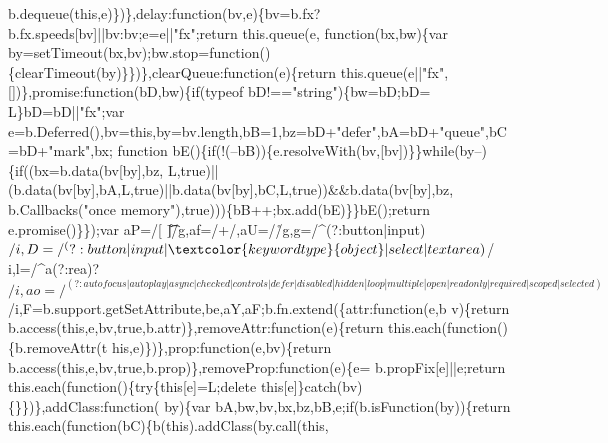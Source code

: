 \begin{DoxyCode}
      b.dequeue(\textcolor{keyword}{this},e)\})\},delay:\textcolor{keyword}{function}(bv,e)\{bv=b.fx?b.fx.speeds[bv]||bv:bv;e=e||\textcolor{stringliteral}{"fx"};\textcolor{keywordflow}{return} this.queue(e,\textcolor{keyword}{
      function}(bx,bw)\{var by=setTimeout(bx,bv);bw.stop=\textcolor{keyword}{function}()\{clearTimeout(by)\}\})\},clearQueue:\textcolor{keyword}{function}(e)\{\textcolor{keywordflow}{return} 
      this.queue(e||\textcolor{stringliteral}{"fx"},[])\},promise:\textcolor{keyword}{function}(bD,bw)\{\textcolor{keywordflow}{if}(typeof bD!==\textcolor{stringliteral}{"string"})\{bw=bD;bD=
      L\}bD=bD||\textcolor{stringliteral}{"fx"};var e=b.Deferred(),bv=\textcolor{keyword}{this},by=bv.length,bB=1,bz=bD+\textcolor{stringliteral}{"defer"},bA=bD+\textcolor{stringliteral}{"queue"},bC=bD+\textcolor{stringliteral}{"mark"},bx;\textcolor{keyword}{
      function} bE()\{\textcolor{keywordflow}{if}(!(--bB))\{e.resolveWith(bv,[bv])\}\}\textcolor{keywordflow}{while}(by--)\{\textcolor{keywordflow}{if}((bx=b.data(bv[by],bz,
      L,\textcolor{keyword}{true})||(b.data(bv[by],bA,L,\textcolor{keyword}{true})||b.data(bv[by],bC,L,\textcolor{keyword}{true}))&&b.data(bv[by],bz,
      b.Callbacks(\textcolor{stringliteral}{"once memory"}),\textcolor{keyword}{true})))\{bB++;bx.add(bE)\}\}bE();\textcolor{keywordflow}{return} e.promise()\}\});var aP=/[
      \n\t\r]/g,af=/\s+/,aU=/\r/g,g=/^(?:button|input)$/i,D=/^(?:button|input|\textcolor{keywordtype}{object}|select|textarea)$/
      i,l=/^a(?:rea)?$/i,ao=/^(?:autofocus|autoplay|async|checked|controls|defer|disabled|hidden|loop|multiple|
      open|readonly|required|scoped|selected)$/i,F=b.support.getSetAttribute,be,aY,aF;b.fn.extend(\{attr:function(e,b
      v)\{return b.access(this,e,bv,true,b.attr)\},removeAttr:\textcolor{keyword}{function}(e)\{return this.each(function()\{b.removeAttr(t
      his,e)\})\},prop:\textcolor{keyword}{function}(e,bv)\{\textcolor{keywordflow}{return} b.access(\textcolor{keyword}{this},e,bv,\textcolor{keyword}{true},b.prop)\},removeProp:\textcolor{keyword}{function}(e)\{e=
      b.propFix[e]||e;\textcolor{keywordflow}{return} this.each(\textcolor{keyword}{function}()\{\textcolor{keywordflow}{try}\{\textcolor{keyword}{this}[e]=L;\textcolor{keyword}{delete} \textcolor{keyword}{this}[e]\}\textcolor{keywordflow}{catch}(bv)\{\}\})\},addClass:\textcolor{keyword}{function}(
      by)\{var bA,bw,bv,bx,bz,bB,e;\textcolor{keywordflow}{if}(b.isFunction(by))\{\textcolor{keywordflow}{return} this.each(\textcolor{keyword}{function}(bC)\{b(\textcolor{keyword}{this}).addClass(by.call(\textcolor{keyword}{this},

\end{DoxyCode}
